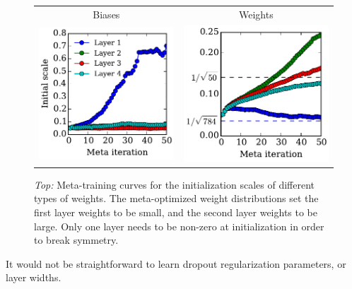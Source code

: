 \documentclass{article}
\begin{document}
\begin{figure}[h!]
\vskip 0.2in
\begin{center}
\begin{tabular}{cc}
 Biases & Weights \\
\hspace{-1em}\includegraphics[width=0.5\columnwidth, height=0.5\columnwidth]{../experiments/Feb_3_training_schedules/3_adam_50/init_bias_learning_curve.pdf} &
\hspace{-1em}\includegraphics[width=0.5\columnwidth, height=0.5\columnwidth]{../experiments/Feb_3_training_schedules/3_adam_50/init_weight_learning_curve.pdf}
\end{tabular}
\caption{\emph{Top:} Meta-training curves for the initialization scales of different types of weights.
The meta-optimized weight distributions set the first layer weights to be small, and the second layer weights to be large.
Only one layer needs to be non-zero at initialization in order to break symmetry.}
\label{fig:nn weight init scales}
\end{center}
\vskip -0.2in
\end{figure} 

It would not be straightforward to learn dropout regularization parameters, or layer widths.
\end{document}
